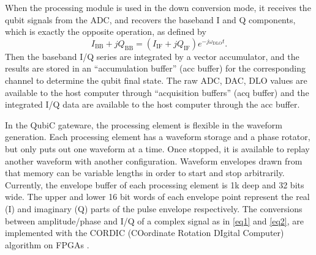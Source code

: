 \documentclass{ieeetran}
\begin{document}
When the processing module is used in the down conversion mode, it receives the qubit signals from the ADC, and recovers the baseband I and Q components, which is exactly the opposite operation, as defined by
\begin{equation}
\label{eq2}
I_{\mathrm{BB}} + jQ_{\mathrm{BB}} = \left( I_{\mathrm{IF}} + jQ_{\mathrm{IF}} \right) e^{-j\omega_{\mathrm{DLO}}t} .
\end{equation}
Then the baseband I/Q series are integrated by a vector accumulator, and the results are stored in an ``accumulation buffer'' (acc buffer) for the corresponding channel to determine the qubit final state. 
The raw ADC, DAC, DLO values are available to the host computer through ``acquisition buffers'' (acq buffer) and the integrated I/Q data are available to the host computer through the acc buffer.

In the QubiC gateware, the processing element is flexible in the waveform generation.
Each processing element has a waveform storage and a phase rotator, but only puts out one waveform at a time. 
Once stopped, it is available to replay another waveform with another configuration. 
Waveform envelopes drawn from that memory can be variable lengths in order to start and stop arbitrarily.
Currently, the envelope buffer of each processing element is 1k deep and 32 bits wide. 
The upper and lower 16 bit words of each envelope point represent the real (I) and imaginary (Q) parts of the pulse envelope respectively.
The conversions between amplitude/phase and I/Q of a complex signal as in \eqref{eq1} and \eqref{eq2}, are implemented with the CORDIC (COordinate Rotation DIgital Computer) algorithm on FPGAs \cite{volder1959the,andraka1998a}.
\end{document}

